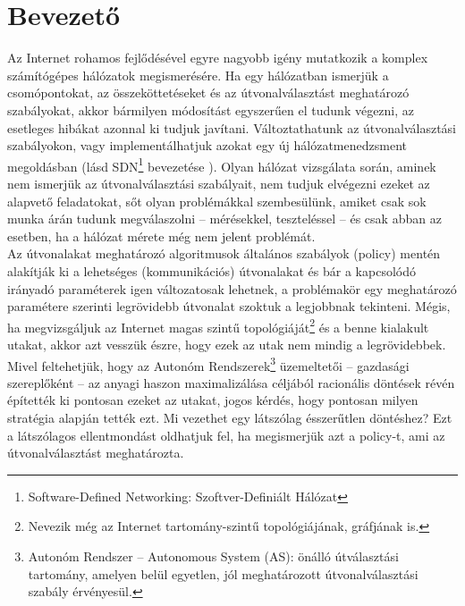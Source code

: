 \chapter*{Bevezető}
Az Internet rohamos fejlődésével egyre nagyobb igény mutatkozik a komplex számítógépes hálózatok megismerésére. Ha egy hálózatban ismerjük a csomópontokat, az összeköttetéseket és az útvonalválasztást meghatározó szabályokat, akkor bármilyen módosítást egyszerűen el tudunk végezni, az esetleges hibákat azonnal ki tudjuk javítani. Változtathatunk az útvonalválasztási szabályokon, vagy implementálhatjuk azokat egy új hálózatmenedzsment megoldásban (lásd SDN\footnote{Software-Defined Networking: Szoftver-Definiált Hálózat} bevezetése \cite{sdn-deploy}). Olyan hálózat vizsgálata során, aminek nem ismerjük az útvonalválasztási szabályait, nem tudjuk elvégezni ezeket az alapvető feladatokat, sőt olyan problémákkal szembesülünk, amiket csak sok munka árán tudunk megválaszolni -- mérésekkel, teszteléssel -- és csak abban az esetben, ha a hálózat mérete még nem jelent problémát.\\

Az útvonalakat meghatározó algoritmusok általános szabályok (policy) mentén alakítják ki a lehetséges (kommunikációs) útvonalakat és bár a kapcsolódó irányadó paraméterek igen változatosak lehetnek, a problémakör egy meghatározó paramétere szerinti legrövidebb útvonalat szoktuk a legjobbnak tekinteni. Mégis, ha megvizsgáljuk az Internet magas szintű topológiáját\footnote{Nevezik még az Internet tartomány-szintű topológiájának, gráfjának is.} és a benne kialakult utakat, akkor azt vesszük észre, hogy ezek az utak nem mindig a legrövidebbek. Mivel feltehetjük, hogy az Autonóm Rendszerek\footnote{Autonóm Rendszer -- Autonomous System (AS): önálló útválasztási tartomány, amelyen belül egyetlen, jól meghatározott útvonalválasztási szabály érvényesül.} üzemeltetői -- gazdasági szereplőként -- az anyagi haszon maximalizálása céljából racionális döntések révén építették ki pontosan ezeket az utakat, jogos kérdés, hogy pontosan milyen stratégia alapján tették ezt. Mi vezethet egy látszólag ésszerűtlen döntéshez? Ezt a látszólagos ellentmondást oldhatjuk fel, ha megismerjük azt a policy-t, ami az útvonalválasztást meghatározta.\\

